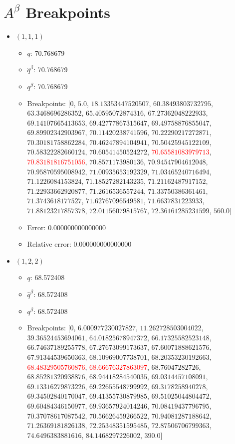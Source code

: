 \documentclass{article}%
\begin{document}
\section{$A^\beta$ Breakpoints}%
\thispagestyle{plain}%
\begin{itemize}%
	\item $(1, 1, 1)$%
	\begin{itemize}%
		\item $q$: 70.768679%
		\item $\hat{q}^\beta$: 70.768679%
		\item $q^\beta$: 70.768679%
		\item Breakpoints: $[$$0$, $5.0$, $18.13353447520507$, $60.38493803732795$, $63.3468696286352$, $65.40595072874316$, $67.27362048222933$, $69.14107665413653$, $69.42777867315647$, $69.49758876855047$, $69.89902342903967$, $70.11420238741596$, $70.22290217272871$, $70.30181758862284$, $70.46247894104941$, $70.50425945122109$, $70.58322282660124$, $70.60541450524272$, \textcolor{red}{$70.65581083979713$}, \textcolor{red}{$70.83181816751056$}, $70.8571173980136$, $70.94547904612048$, $70.95870595008942$, $71.00935653192329$, $71.03465240716494$, $71.1226084153824$, $71.18527282143235$, $71.21162487917152$, $71.22933662920877$, $71.2616536557244$, $71.33750386361461$, $71.3743618177527$, $71.62767096549581$, $71.6637831223933$, $71.88123217857378$, $72.01156079815767$, $72.36161285231599$, $560.0$$]$%
		\item Error: 0.000000000000000%
		\item Relative error: 0.000000000000000%
	\end{itemize}%
	\item $(1, 2, 2)$%
	\begin{itemize}%
		\item $q$: 68.572408%
		\item $\hat{q}^\beta$: 68.572408%
		\item $q^\beta$: 68.572408%
		\item Breakpoints: $[$$0$, $6.000977230027827$, $11.262728503004022$, $39.36524453694061$, $64.01825678947372$, $66.17325582523148$, $66.74637189255778$, $67.27673099173637$, $67.60071888621576$, $67.91344539650363$, $68.10969007738701$, $68.20353230192663$, \textcolor{red}{$68.48329505760876$}, \textcolor{red}{$68.66676327863097$}, $68.76047282726$, $68.85281320938876$, $68.94418284540035$, $69.0314457108091$, $69.13316279873226$, $69.22655548799992$, $69.3178258940278$, $69.34502840170047$, $69.41355730879985$, $69.51025044804472$, $69.60484346150977$, $69.93657924014246$, $70.08419437796795$, $70.37078617087542$, $70.56626459266522$, $70.94081287188642$, $71.26369181826138$, $72.25348351595485$, $72.87506706799363$, $74.6496383881616$, $84.1468297226002$, $390.0$$]$%

\end{itemize}
\end{itemize}
\end{document}
